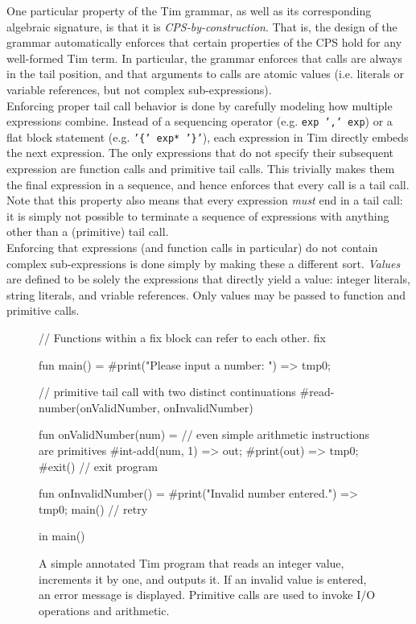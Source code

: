 One particular property of the Tim grammar, as well as its corresponding algebraic signature, is that it is \textit{\ac{CPS}-by-construction}. That is, the design of the grammar automatically enforces that certain properties of the \ac{CPS} hold for any well-formed Tim term. In particular, the grammar enforces that calls are always in the tail position, and that arguments to calls are atomic values (i.e. literals or variable references, but not complex sub-expressions).\\

Enforcing proper tail call behavior is done by carefully modeling how multiple expressions combine. Instead of a sequencing operator (e.g. \texttt{exp ',' exp}) or a flat block statement (e.g. \texttt{'\{' exp* '\}'}), each expression in Tim directly embeds the next expression. The only expressions that do not specify their subsequent expression are function calls and primitive tail calls. This trivially makes them the final expression in a sequence, and hence enforces that every call is a tail call. Note that this property also means that every expression \textit{must} end in a tail call: it is simply not possible to terminate a sequence of expressions with anything other than a (primitive) tail call.\\

Enforcing that expressions (and function calls in particular) do not contain complex sub-expressions is done simply by making these a different sort. \textit{Values} are defined to be solely the expressions that directly yield a value: integer literals, string literals, and vriable references. Only values may be passed to function and primitive calls.\\

\begin{figure}
  \begin{tim}
// Functions within a fix block can refer to each other.
fix {
  fun main() =
    #print("Please input a number: ") => tmp0;

    // primitive tail call with two distinct continuations
    #read-number(onValidNumber, onInvalidNumber)
    
  fun onValidNumber(num) =
    // even simple arithmetic instructions are primitives
    #int-add(num, 1) => out;
    #print(out) => tmp0;
    #exit() // exit program
    
  fun onInvalidNumber() =
    #print("Invalid number entered.") => tmp0;
    main() // retry
} in
  main()
  \end{tim}
  \caption{A simple annotated Tim program that reads an integer value, increments it by one, and outputs it. If an invalid value is entered, an error message is displayed. Primitive calls are used to invoke I/O operations and arithmetic.}
  \label{fig:tim_example}
\end{figure}

